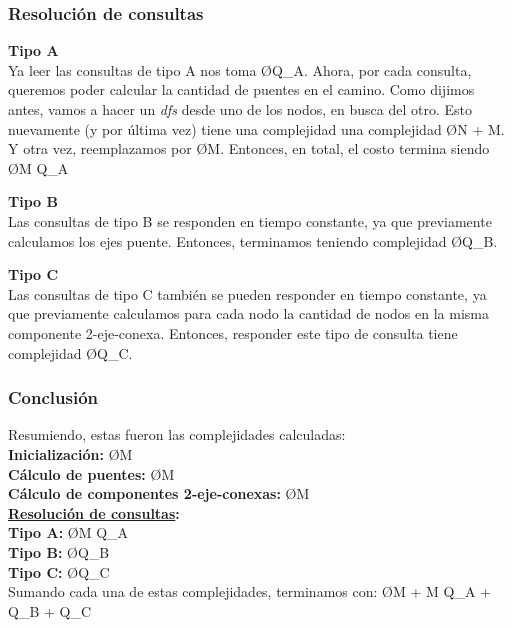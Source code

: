 \subsubsection{Resolución de consultas}
\noindent
\textbf{Tipo A}\\
\noindent
Ya leer las consultas de tipo A nos toma \O{Q_A}. Ahora, por cada consulta, queremos poder calcular la cantidad de puentes en el camino. Como dijimos antes, vamos a hacer un \textit{dfs} desde uno de los nodos, en busca del otro. Esto nuevamente (y por última vez) tiene una complejidad una complejidad \O{N + M}. Y otra vez, reemplazamos por \O{M}. Entonces, en total, el costo termina siendo \O{M Q_A}

\hfill \break \noindent
\textbf{Tipo B}\\
\noindent
Las consultas de tipo B se responden en tiempo constante, ya que previamente calculamos los ejes puente. Entonces, terminamos teniendo complejidad \O{Q_B}.

\hfill \break \noindent
\textbf{Tipo C}\\
\noindent
Las consultas de tipo C también se pueden responder en tiempo constante, ya que previamente calculamos para cada nodo la cantidad de nodos en la misma componente 2-eje-conexa. Entonces, responder este tipo de consulta tiene complejidad \O{Q_C}.


\subsubsection{Conclusión}
\noindent
Resumiendo, estas fueron las complejidades calculadas:\\
\textbf{Inicialización:} \O{M}\\
\textbf{Cálculo de puentes:} \O{M}\\
\textbf{Cálculo de componentes 2-eje-conexas:} \O{M}\\
\textbf{\underline{Resolución de consultas}:}\\
\textbf{  Tipo A:} \O{M Q_A}\\
\textbf{  Tipo B:} \O{Q_B}\\
\textbf{  Tipo C:} \O{Q_C}\\

\noindent
Sumando cada una de estas complejidades, terminamos con: \O{M + M Q_A + Q_B + Q_C}



